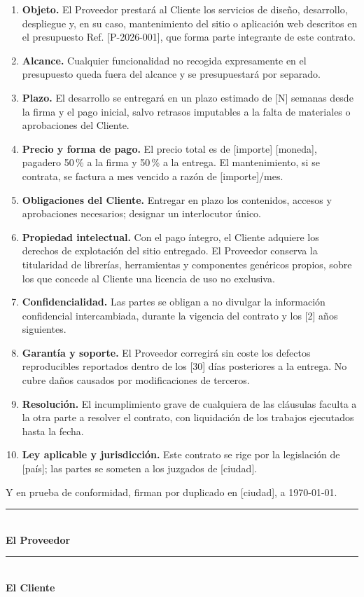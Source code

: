 \documentclass[11pt,a4paper]{article}
\begin{document}
\begin{enumerate}[label=\textbf{\arabic*.}, leftmargin=2em]

\item \textbf{Objeto.} El Proveedor prestará al Cliente los servicios de
diseño, desarrollo, despliegue y, en su caso, mantenimiento del sitio o
aplicación web descritos en el presupuesto Ref. [P-2026-001], que forma parte
integrante de este contrato.

\item \textbf{Alcance.} Cualquier funcionalidad no recogida expresamente en el
presupuesto queda fuera del alcance y se presupuestará por separado.

\item \textbf{Plazo.} El desarrollo se entregará en un plazo estimado de
[N] semanas desde la firma y el pago inicial, salvo retrasos imputables a la
falta de materiales o aprobaciones del Cliente.

\item \textbf{Precio y forma de pago.} El precio total es de [importe]
[moneda], pagadero 50\,\% a la firma y 50\,\% a la entrega. El mantenimiento,
si se contrata, se factura a mes vencido a razón de [importe]/mes.

\item \textbf{Obligaciones del Cliente.} Entregar en plazo los contenidos,
accesos y aprobaciones necesarios; designar un interlocutor único.

\item \textbf{Propiedad intelectual.} Con el pago íntegro, el Cliente adquiere
los derechos de explotación del sitio entregado. El Proveedor conserva la
titularidad de librerías, herramientas y componentes genéricos propios, sobre
los que concede al Cliente una licencia de uso no exclusiva.

\item \textbf{Confidencialidad.} Las partes se obligan a no divulgar la
información confidencial intercambiada, durante la vigencia del contrato y
los [2] años siguientes.

\item \textbf{Garantía y soporte.} El Proveedor corregirá sin coste los
defectos reproducibles reportados dentro de los [30] días posteriores a la
entrega. No cubre daños causados por modificaciones de terceros.

\item \textbf{Resolución.} El incumplimiento grave de cualquiera de las
cláusulas faculta a la otra parte a resolver el contrato, con liquidación de
los trabajos ejecutados hasta la fecha.

\item \textbf{Ley aplicable y jurisdicción.} Este contrato se rige por la
legislación de [país]; las partes se someten a los juzgados de [ciudad].

\end{enumerate}

Y en prueba de conformidad, firman por duplicado en [ciudad], a \today.

\vspace{3.5em}
\begin{minipage}{0.45\linewidth}
  \rule{\linewidth}{0.4pt}\\ \textbf{El Proveedor}
\end{minipage}\hfill
\begin{minipage}{0.45\linewidth}
  \rule{\linewidth}{0.4pt}\\ \textbf{El Cliente}
\end{minipage}
\end{document}
